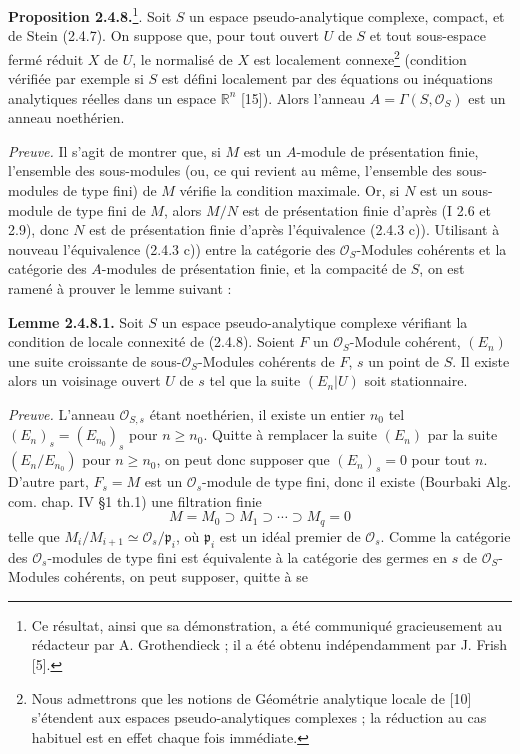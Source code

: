 \textbf{Proposition 2.4.8.}\footnote{Ce résultat, ainsi que sa démonstration, a été communiqué gracieusement au rédacteur par A. Grothendieck ; il a été obtenu indépendamment par J. Frish [5].}. Soit $S$ un espace pseudo-analytique complexe, compact, et de Stein (2.4.7). On suppose que, pour tout ouvert $U$ de $S$ et tout sous-espace fermé réduit $X$ de $U$, le normalisé de $X$ est localement connexe\footnote{Nous admettrons que les notions de Géométrie analytique locale de [10] s'étendent aux espaces pseudo-analytiques complexes ; la réduction au cas habituel est en effet chaque fois immédiate.} (condition vérifiée par exemple si $S$ est défini localement par des équations ou inéquations analytiques réelles dans un espace $\mathbb R^n$ [15]). Alors l'anneau $A=\Gamma(S,\mathcal O_S)$ est un anneau noethérien.

\emph{Preuve.} Il s'agit de montrer que, si $M$ est un $A$-module de présentation finie, l'ensemble des sous-modules (ou, ce qui revient au même, l'ensemble des sous-modules de type fini) de $M$ vérifie la condition maximale. Or, si $N$ est un sous-module de type fini de $M$, alors $M/N$ est de présentation finie d'après (I 2.6 et 2.9), donc $N$ est de présentation finie d'après l'équivalence (2.4.3 c)). Utilisant à nouveau l'équivalence (2.4.3 c)) entre la catégorie des $\mathcal O_S$-Modules cohérents et la catégorie des $A$-modules de présentation finie, et la compacité de $S$, on est ramené à prouver le lemme suivant :

\textbf{Lemme 2.4.8.1.} Soit $S$ un espace pseudo-analytique complexe vérifiant la condition de locale connexité de (2.4.8). Soient $F$ un $\mathcal O_S$-Module cohérent, $(E_n)$ une suite croissante de sous-$\mathcal O_S$-Modules cohérents de $F$, $s$ un point de $S$. Il existe alors un voisinage ouvert $U$ de $s$ tel que la suite $(E_n|U)$ soit stationnaire.

\emph{Preuve.} L'anneau $\mathcal O_{S,s}$ étant noethérien, il existe un entier $n_0$ tel $(E_n)_s=(E_{n_0})_s$ pour $n\geq n_0$. Quitte à remplacer la suite $(E_n)$ par la suite $(E_n/E_{n_0})$ pour $n\geq n_0$, on peut donc supposer que $(E_n)_s=0$ pour tout $n$. D'autre part, $F_s=M$ est un $\mathcal O_s$-module de type fini, donc il existe (Bourbaki Alg. com. chap. IV \S1 th.1) une filtration finie
\[
 M=M_0\supset M_1\supset\cdots\supset M_q=0
\]
telle que $M_i/M_{i+1}\simeq \mathcal O_s/\mathfrak p_i$, où $\mathfrak p_i$ est un idéal premier de $\mathcal O_s$. Comme la catégorie des $\mathcal O_s$-modules de type fini est équivalente à la catégorie des germes en $s$ de $\mathcal O_S$-Modules cohérents, on peut supposer, quitte à se
